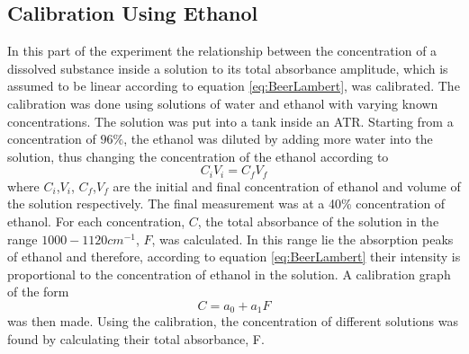 \documentclass[reprint,amsmath,amssymb,aps, prl,superscriptaddress]{revtex4-2}
\begin{document}
\subsection{Calibration Using Ethanol} 
In this part of the experiment the relationship between the concentration of a dissolved substance inside a solution
to its total absorbance amplitude, which is assumed to be linear according to equation \ref{eq:BeerLambert}, was calibrated. The calibration was done using solutions of water and ethanol  with varying known concentrations. The solution was put into a tank inside an ATR. Starting from a concentration of $96\%$, the ethanol was diluted by adding more water into the solution, thus changing the concentration of the ethanol according to 
\begin{equation} \label{eq:EthanolConcentrVolume}
C_{i}V_{i} = C_{f}V_{f}
\end{equation}
where $C_{i}$,$V_{i}$, $C_{f}$,$V_{f}$ are the initial and final concentration of ethanol and volume of the solution respectively. The final measurement was at a 40\% concentration of ethanol.
For each concentration, $C$, the total absorbance of the solution in the range $1000-1120cm^{-1}$, $F$, was calculated. In this range lie the absorption peaks of ethanol \cite{NISTwebook} and therefore, according to equation \ref{eq:BeerLambert} their intensity is proportional to the concentration of ethanol in the solution. A calibration graph of the form 
\begin{equation} \label{eq:EthanolLinFit}
    C=a_{0}+a_{1}F 
\end{equation} 
was then made. Using the calibration, the concentration of different solutions was found by calculating their total absorbance, F. 
\end{document}

